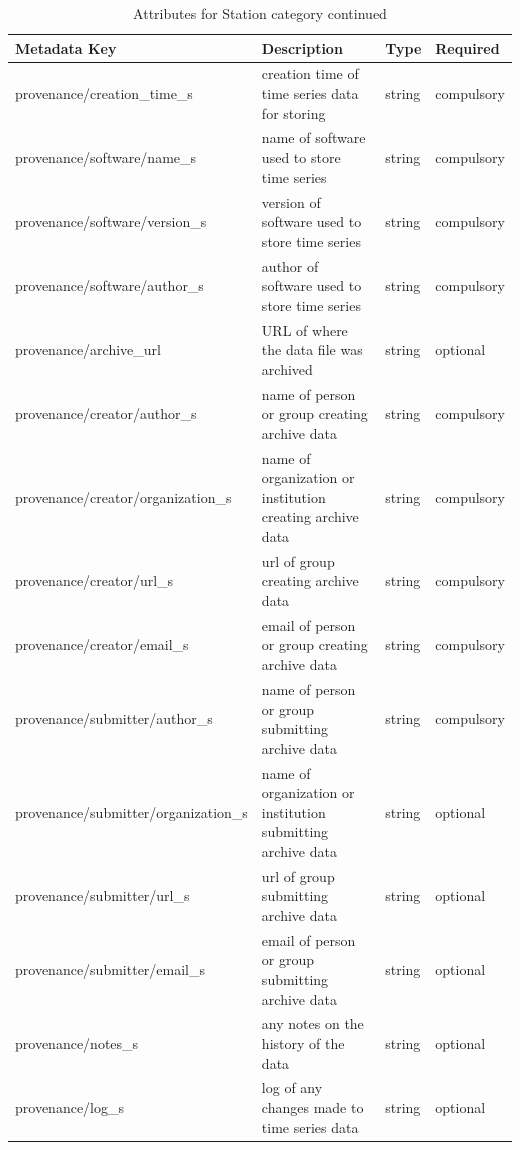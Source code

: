 \documentclass{article}
\begin{document}
\newpage
\begin{table}[htb!]
	\caption[Attributes for Survey]{Attributes for Station category continued}
	\begin{tabular}{|l|p{3in}|l|l|}
		\hline
		\textbf{Metadata Key} & \textbf{Description} & \textbf{Type} & \textbf{Required} \\ \hline	
		provenance/creation\_time\_s & creation time of time series data for storing & string & compulsory \\ \hline
		provenance/software/name\_s & name of software used to store time series & string & compulsory \\ \hline
		provenance/software/version\_s & version of software used to store time series & string & compulsory \\ \hline
		provenance/software/author\_s & author of software used to store time series & string & compulsory \\ \hline
		provenance/archive\_url & URL of where the data file was archived & string & optional \\ \hline
		provenance/creator/author\_s & name of person or group creating archive data & string & compulsory \\ \hline
		provenance/creator/organization\_s & name of organization or institution creating archive data & string & compulsory \\ \hline
		provenance/creator/url\_s & url of group creating archive data & string & compulsory \\ \hline
		provenance/creator/email\_s & email of person or group creating archive data & string & compulsory \\ \hline
		provenance/submitter/author\_s & name of person or group submitting archive data & string & compulsory \\ \hline
		provenance/submitter/organization\_s & name of organization or institution submitting archive data & string & optional \\ \hline
		provenance/submitter/url\_s & url of group submitting archive data & string & optional \\ \hline
		provenance/submitter/email\_s & email of person or group submitting archive data & string & optional  \\ \hline
		provenance/notes\_s & any notes on the history of the data & string & optional \\ \hline
		provenance/log\_s & log of any changes made to time series data & string & optional \\ \hline
	\end{tabular}
	\label{tab:station02}
\end{table}
   
\end{document}
